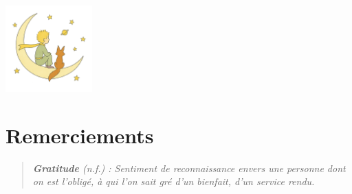 \begin{center}

\vfill %
\includegraphics[width=0.25\textwidth]{0_Liminaires/Images/2025-08-10_ChatGPT.png} %

\end{center}

\newpage
{}

\section*{Remerciements}

\begin{quote}\textit{\og \textbf{Gratitude} (n.f.) : Sentiment de reconnaissance envers une personne dont on est l'obligé, à qui l'on sait gré d'un bienfait, d'un service rendu. \fg{}}%
\vspace{0.5\baselineskip} %
 \end{quote}%

